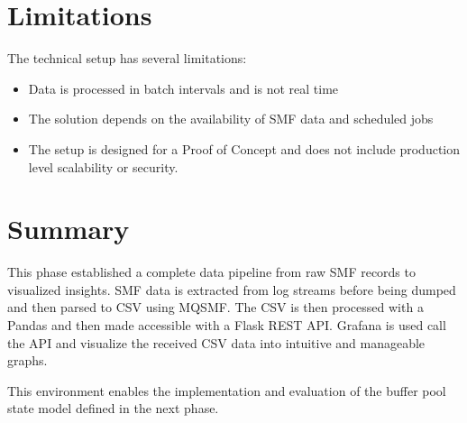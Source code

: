 \section{Limitations}

The technical setup has several limitations:

\begin{itemize}
    \item Data is processed in batch intervals and is not real time
    \item The solution depends on the availability of SMF data and scheduled jobs
    \item The setup is designed for a Proof of Concept and does not include production level scalability or security.
\end{itemize}

\section{Summary}

This phase established a complete data pipeline from raw SMF records to visualized insights. SMF data is extracted from log streams before being dumped and then parsed to CSV using MQSMF. The CSV is then processed with a Pandas and then made accessible with a Flask REST API. Grafana is used call the API and visualize the received CSV data into intuitive and manageable graphs.

This environment enables the implementation and evaluation of the buffer pool state model defined in the next phase.